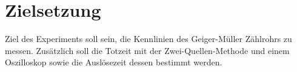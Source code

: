 \section{Zielsetzung}
\label{sec:Zielsetzung}

Ziel des Experiments soll sein, die Kennlinien des Geiger-Müller Zählrohrs
zu messen. Zusätzlich soll die Totzeit mit der Zwei-Quellen-Methode und einem
Oszilloskop sowie die Auslösezeit dessen bestimmt werden.